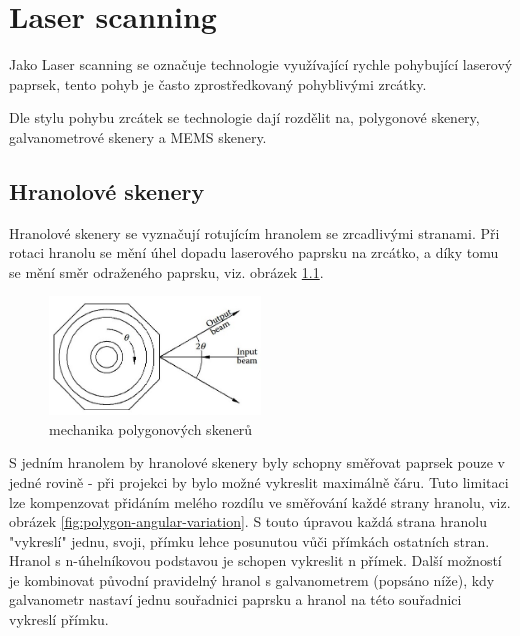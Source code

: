 \chapter{Laser scanning~\cite{scanning-handbook}}

Jako Laser scanning se označuje technologie využívající rychle pohybující laserový paprsek, tento pohyb je často zprostředkovaný pohyblivými zrcátky.

Dle stylu pohybu zrcátek se technologie dají rozdělit na, polygonové skenery, galvanometrové skenery a MEMS skenery.

\section{Hranolové skenery}
Hranolové skenery se vyznačují rotujícím hranolem se zrcadlivými stranami. Při rotaci hranolu se mění úhel dopadu laserového paprsku na zrcátko, a díky tomu se mění směr odraženého paprsku, viz. obrázek \ref{fig:polygon-scanner}. 

\begin{figure}[H]
  \centering
  \includegraphics[width=0.5\textwidth]{img/polygon-scanner.jpg}
  \caption{\label{fig:polygon-scanner} mechanika polygonových skenerů}
\end{figure}


%

S jedním hranolem by hranolové skenery byly schopny směřovat paprsek pouze v jedné rovině - při projekci by bylo možné vykreslit maximálně čáru. Tuto limitaci lze kompenzovat přidáním melého rozdílu ve směřování každé strany hranolu, viz. obrázek \ref{fig:polygon-angular-variation}. S touto úpravou každá strana hranolu "vykreslí" jednu, svoji, přímku lehce posunutou vůči přímkách ostatních stran. Hranol s n-úhelníkovou podstavou je schopen vykreslit n přímek.
Další možností je kombinovat původní pravidelný hranol s galvanometrem (popsáno níže), kdy galvanometr nastaví jednu souřadnici paprsku a hranol na této souřadnici vykreslí přímku.

